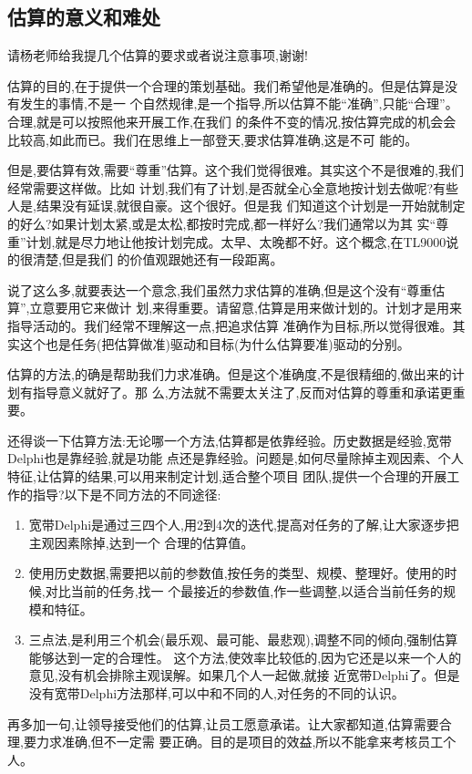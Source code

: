 \documentclass[11pt]{article}
\begin{document}
\subsection{估算的意义和难处}
\qlogo \begin{staff}
请杨老师给我提几个估算的要求或者说注意事项,谢谢!
\end{staff}

\begin{yang}
  \ylogo 估算的目的,在于提供一个合理的策划基础。我们希望他是准确的。但是估算是没有发生的事情,不是一
  个自然规律,是一个指导,所以估算不能``准确'',只能``合理''。合理,就是可以按照他来开展工作,在我们
  的条件不变的情况,按估算完成的机会会比较高,如此而已。我们在思维上一部登天,要求估算准确,这是不可
  能的。

  但是,要估算有效,需要``尊重''估算。这个我们觉得很难。其实这个不是很难的,我们经常需要这样做。比如
  计划,我们有了计划,是否就全心全意地按计划去做呢?有些人是,结果没有延误,就很自豪。这个很好。但是我
  们知道这个计划是一开始就制定的好么?如果计划太紧,或是太松,都按时完成,都一样好么?我们通常以为其
  实``尊重''计划,就是尽力地让他按计划完成。太早、太晚都不好。这个概念,在TL9000说的很清楚,但是我们
  的价值观跟她还有一段距离。

  说了这么多,就要表达一个意念,我们虽然力求估算的准确,但是这个没有``尊重估算'',立意要用它来做计
  划,来得重要。请留意,估算是用来做计划的。计划才是用来指导活动的。我们经常不理解这一点,把追求估算
  准确作为目标,所以觉得很难。其实这个也是任务(把估算做准)驱动和目标(为什么估算要准)驱动的分别。

  估算的方法,的确是帮助我们力求准确。但是这个准确度,不是很精细的,做出来的计划有指导意义就好了。那
  么,方法就不需要太关注了,反而对估算的尊重和承诺更重要。

  还得谈一下估算方法:无论哪一个方法,估算都是依靠经验。历史数据是经验,宽带Delphi也是靠经验,就是功能
  点还是靠经验。问题是,如何尽量除掉主观因素、个人特征,让估算的结果,可以用来制定计划,适合整个项目
  团队,提供一个合理的开展工作的指导?以下是不同方法的不同途径:

\begin{enumerate}
\item 宽带Delphi是通过三四个人,用2到4次的迭代,提高对任务的了解,让大家逐步把主观因素除掉,达到一个
  合理的估算值。
\item 使用历史数据,需要把以前的参数值,按任务的类型、规模、整理好。使用的时候,对比当前的任务,找一
  个最接近的参数值,作一些调整,以适合当前任务的规模和特征。
\item 三点法,是利用三个机会(最乐观、最可能、最悲观),调整不同的倾向,强制估算能够达到一定的合理性。
  这个方法,使效率比较低的,因为它还是以来一个人的意见,没有机会排除主观误解。如果几个人一起做,就接
  近宽带Delphi了。但是没有宽带Delphi方法那样,可以中和不同的人,对任务的不同的认识。
\end{enumerate}

再多加一句,让领导接受他们的估算,让员工愿意承诺。让大家都知道,估算需要合理,要力求准确,但不一定需
要正确。目的是项目的效益,所以不能拿来考核员工个人。
\end{yang}
\end{document}
